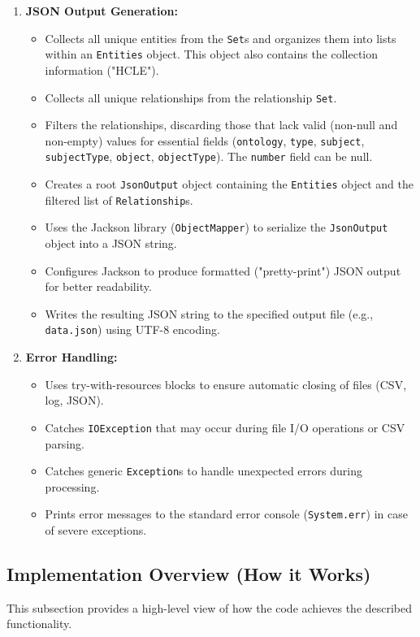 \begin{enumerate}
    \item \textbf{JSON Output Generation:}
        \begin{itemize}
            \item Collects all unique entities from the \texttt{Set}s and organizes them into lists within an \texttt{Entities} object. This object also contains the collection information ("HCLE").
            \item Collects all unique relationships from the relationship \texttt{Set}.
            \item Filters the relationships, discarding those that lack valid (non-null and non-empty) values for essential fields (\texttt{ontology}, \texttt{type}, \texttt{subject}, \texttt{subjectType}, \texttt{object}, \texttt{objectType}). The \texttt{number} field can be null.
            \item Creates a root \texttt{JsonOutput} object containing the \texttt{Entities} object and the filtered list of \texttt{Relationship}s.
            \item Uses the Jackson library (\texttt{ObjectMapper}) to serialize the \texttt{JsonOutput} object into a JSON string.
            \item Configures Jackson to produce formatted ("pretty-print") JSON output for better readability.
            \item Writes the resulting JSON string to the specified output file (e.g., \texttt{data.json}) using UTF-8 encoding.
        \end{itemize}

    \item \textbf{Error Handling:}
        \begin{itemize}
            \item Uses try-with-resources blocks to ensure automatic closing of files (CSV, log, JSON).
            \item Catches \texttt{IOException} that may occur during file I/O operations or CSV parsing.
            \item Catches generic \texttt{Exception}s to handle unexpected errors during processing.
            \item Prints error messages to the standard error console (\texttt{System.err}) in case of severe exceptions.
        \end{itemize}
\end{enumerate}

\subsection{Implementation Overview (How it Works)}
This subsection provides a high-level view of how the code achieves the described functionality.

